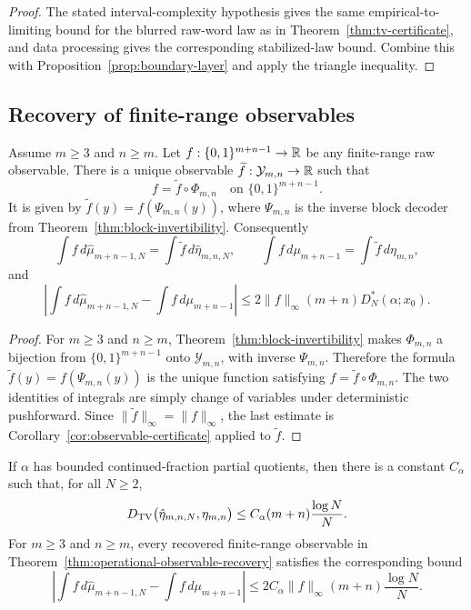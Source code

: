 \begin{proof}
The stated interval-complexity hypothesis gives the same empirical-to-limiting
bound for the blurred raw-word law as in Theorem~\ref{thm:tv-certificate}, and
data processing gives the corresponding stabilized-law bound. Combine this with
Proposition~\ref{prop:boundary-layer} and apply the triangle inequality.
\end{proof}

\subsection{Recovery of finite-range observables}

\begin{theorem}\label{thm:operational-observable-recovery}
Assume $m\ge3$ and $n\ge m$.  Let
$f:\{0,1\}^{m+n-1}\to\mathbb{R}$ be any finite-range raw observable.  There is a
unique observable $\widetilde f:\mathcal Y_{m,n}\to\mathbb{R}$ such that
\[
f=\widetilde f\circ\Phi_{m,n}
\quad\text{on }\{0,1\}^{m+n-1}.
\]
It is given by $\widetilde f(y)=f(\Psi_{m,n}(y))$, where
$\Psi_{m,n}$ is the inverse block decoder from
Theorem~\ref{thm:block-invertibility}.  Consequently
\[
\int f\,d\hat{\mu}_{m+n-1,N}
=
\int \widetilde f\,d\hat{\eta}_{m,n,N},
\qquad
\int f\,d\mu_{m+n-1}
=
\int \widetilde f\,d\eta_{m,n},
\]
and
\[
\left|
\int f\,d\hat{\mu}_{m+n-1,N}
-
\int f\,d\mu_{m+n-1}
\right|
\le
2\|f\|_\infty (m+n)D_N^*(\alpha;x_0).
\]
\end{theorem}

\begin{proof}
For $m\ge3$ and $n\ge m$, Theorem~\ref{thm:block-invertibility} makes
$\Phi_{m,n}$ a bijection from $\{0,1\}^{m+n-1}$ onto
$\mathcal Y_{m,n}$, with inverse $\Psi_{m,n}$.  Therefore the formula
$\widetilde f(y)=f(\Psi_{m,n}(y))$ is the unique function satisfying
$f=\widetilde f\circ\Phi_{m,n}$.  The two identities of integrals are simply
change of variables under deterministic pushforward.  Since
$\|\widetilde f\|_\infty=\|f\|_\infty$, the last estimate is
Corollary~\ref{cor:observable-certificate} applied to $\widetilde f$.
\end{proof}

\begin{corollary}\label{cor:tv-bounded-type}
If $\alpha$ has bounded continued-fraction partial quotients, then there is a
constant $C_\alpha$ such that, for all $N\ge2$,
\[
D_{\mathrm{TV}}\bigl(\hat{\eta}_{m,n,N},\eta_{m,n}\bigr)
\le
C_\alpha(m+n)\frac{\log N}{N}.
\]
For $m\ge3$ and $n\ge m$, every recovered finite-range observable in
Theorem~\ref{thm:operational-observable-recovery} satisfies the corresponding
bound
\[
\left|
\int f\,d\hat{\mu}_{m+n-1,N}
-
\int f\,d\mu_{m+n-1}
\right|
\le
2C_\alpha\|f\|_\infty(m+n)\frac{\log N}{N}.
\]
\end{corollary}

